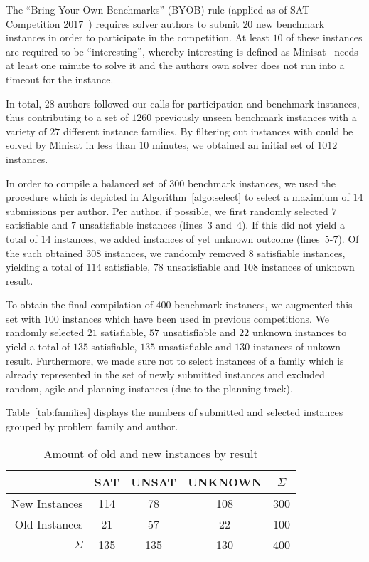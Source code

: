 \documentclass{elsarticle}
\begin{document}
The ``Bring Your Own Benchmarks'' (BYOB) rule (applied as of SAT Competition 2017~\cite{SC2017}) requires solver authors to submit $20$ new benchmark instances in order to participate in the competition. At least $10$ of these instances are required to be ``interesting'', whereby interesting is defined as Minisat~\cite{Niklas:2003:Minisat} needs at least one minute to solve it and the authors own solver does not run into a timeout for the instance. 

In total, $28$ authors followed our calls for participation and benchmark instances, thus contributing to a set of $1260$ previously unseen benchmark instances with a variety of $27$ different instance families. 
By filtering out instances with could be solved by Minisat in less than $10$ minutes, we obtained an initial set of $1012$ instances. 

In order to compile a balanced set of $300$ benchmark instances, we used the procedure which is depicted in Algorithm~\ref{algo:select} to select a maximium of $14$ submissions per author. 
Per author, if possible, we first randomly selected $7$ satisfiable and $7$ unsatisfiable instances (lines~3 and~4). 
If this did not yield a total of $14$ instances, we added instances of yet unknown outcome (lines~5-7). 
Of the such obtained $308$ instances, we randomly removed $8$ satisfiable instances, yielding a total of $114$ satisfiable, $78$ unsatisfiable and $108$ instances of unknown result. 

To obtain the final compilation of $400$ benchmark instances, we augmented this set with $100$ instances which have been used in previous competitions. 
We randomly selected $21$ satisfiable, $57$ unsatisfiable and $22$ unknown instances to yield a total of $135$ satisfiable, $135$ unsatisfiable and $130$ instances of unkown result. 
Furthermore, we made sure not to select instances of a family which is already represented in the set of newly submitted instances and excluded random, agile and planning instances (due to the planning track). 

Table~\ref{tab:families} displays the numbers of submitted and selected instances grouped by problem family and author. 

\begin{table}[t]
\centering
\begin{tabular}{|r|ccc|c|}
\hline
 & SAT & UNSAT & UNKNOWN & $\Sigma$\\
\hline\hline
New Instances & 114 & 78 & 108 & 300 \\
Old Instances & 21 & 57 & 22 & 100\\
\hline
$\Sigma$ & 135 & 135 & 130 & 400\\
\hline
\end{tabular}
\caption{Amount of old and new instances by result}
\label{tab:final}
\end{table}
\end{document}
